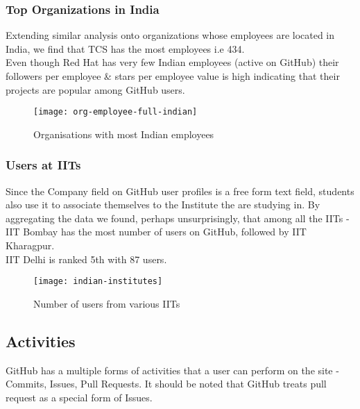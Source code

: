 \newpage

\subsubsection{Top Organizations in India}

Extending similar analysis onto organizations whose employees are located in India, we find that
TCS has the most employees i.e 434. \\

Even though Red Hat has very few Indian employees (active on GitHub) their followers per employee \&
stars per employee value is high indicating that their projects are popular among GitHub users.

\vspace{40px}
\begin{figure}[htb]
\centering
\texttt{[image: org-employee-full-indian]}
\caption{Organisations with most Indian employees}
\end{figure}

\newpage
\subsubsection{Users at IITs}

Since the Company field on GitHub user profiles is a free form text field, students also use it
to associate themselves to the Institute the are studying in. By aggregating the data we found,
perhaps unsurprisingly, that among all the IITs - IIT Bombay has the most number of users on
GitHub, followed by IIT Kharagpur. \\

IIT Delhi is ranked 5th with 87 users.

\vspace{40px}
\begin{figure}[htb]
\centering
\texttt{[image: indian-institutes]}
\caption{Number of users from various IITs}
\end{figure}

\newpage
\subsection{Activities}

GitHub has a multiple forms of activities that a user can perform on the site - Commits, Issues, Pull Requests.
It should be noted that GitHub treats pull request as a special form of Issues. \\

